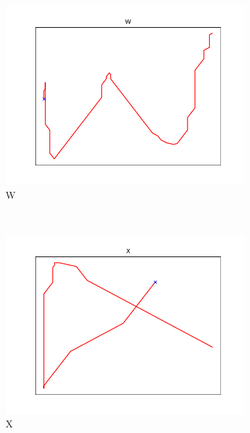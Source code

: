 \begin{figure}
\begin{subfigure}[b]{0.14\textwidth}
        \includegraphics[width=\textwidth]{images/gbem/letters_generated/W.png}
        \caption{W}
    \end{subfigure}
    ~
    \begin{subfigure}[b]{0.14\textwidth}
        \includegraphics[width=\textwidth]{images/gbem/letters_generated/X.png}
        \caption{X}
    \end{subfigure}
    ~
    \begin{subfigure}[b]{0.14\textwidth}

\end{subfigure}
\end{figure}
